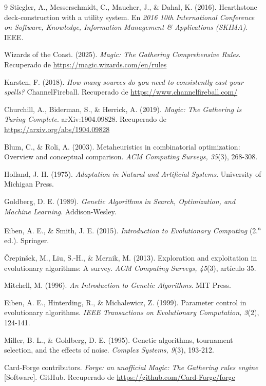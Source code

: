 \begin{thebibliography}{9}
Stiegler, A., Messerschmidt, C., Maucher, J., \& Dahal, K. (2016). Hearthstone deck-construction with a utility system. En \textit{2016 10th International Conference on Software, Knowledge, Information Management \& Applications (SKIMA)}. IEEE.

Wizards of the Coast. (2025). \textit{Magic: The Gathering Comprehensive Rules}. Recuperado de \url{https://magic.wizards.com/en/rules}

Karsten, F. (2018). \textit{How many sources do you need to consistently cast your spells?} ChannelFireball. Recuperado de \url{https://www.channelfireball.com/}

Churchill, A., Biderman, S., \& Herrick, A. (2019). \textit{Magic: The Gathering is Turing Complete}. arXiv:1904.09828. Recuperado de \url{https://arxiv.org/abs/1904.09828}

Blum, C., \& Roli, A. (2003). Metaheuristics in combinatorial optimization: Overview and conceptual comparison. \textit{ACM Computing Surveys, 35}(3), 268-308.

Holland, J. H. (1975). \textit{Adaptation in Natural and Artificial Systems}. University of Michigan Press.

Goldberg, D. E. (1989). \textit{Genetic Algorithms in Search, Optimization, and Machine Learning}. Addison-Wesley.

Eiben, A. E., \& Smith, J. E. (2015). \textit{Introduction to Evolutionary Computing} (2.\textsuperscript{a} ed.). Springer.

Črepinšek, M., Liu, S.-H., \& Mernik, M. (2013). Exploration and exploitation in evolutionary algorithms: A survey. \textit{ACM Computing Surveys, 45}(3), artículo 35.

Mitchell, M. (1996). \textit{An Introduction to Genetic Algorithms}. MIT Press.

Eiben, A. E., Hinterding, R., \& Michalewicz, Z. (1999). Parameter control in evolutionary algorithms. \textit{IEEE Transactions on Evolutionary Computation, 3}(2), 124-141.

Miller, B. L., \& Goldberg, D. E. (1995). Genetic algorithms, tournament selection, and the effects of noise. \textit{Complex Systems, 9}(3), 193-212.

Card-Forge contributors. \textit{Forge: an unofficial Magic: The Gathering rules engine} [Software]. GitHub. Recuperado de \url{https://github.com/Card-Forge/forge}


\end{thebibliography}
